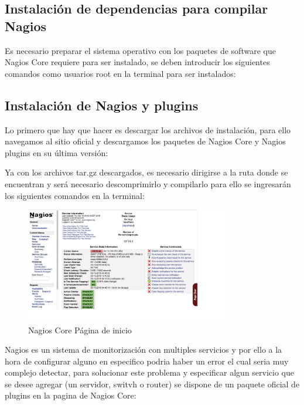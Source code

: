 \documentclass[12pt]{book}
\begin{document}
    \subsection{Instalación de dependencias para compilar Nagios }
    Es necesario preparar el sistema operativo con los paquetes de software que Nagios Core requiere para ser instalado, se deben introducir
    los siguientes comandos como usuarios root en la terminal para ser instalados:
    \begin{alltt}
      
    \end{alltt} 
    \subsection{Instalación de Nagios y plugins }
    Lo primero que hay que hacer es descargar los archivos de instalación, para ello navegamos al sitio oficial y descargamos los paquetes de
    Nagios Core y Nagios plugins en su última versión:
      \begin{alltt}
        
      \end{alltt} 
      Ya con los archivos tar.gz descargados, es necesario dirigirse a la ruta donde se encuentran y será necesario descomprimirlo y compilarlo
      para ello se ingresarán los siguientes comandos en la terminal:
    \begin{alltt}
      
    \end{alltt}
    \begin{figure}[htb]
      \centering
        \includegraphics[width=0.8\textwidth]{./Imagenes/nagios.png}
      \caption{Nagios Core Página de inicio} \label{fig:NagiosCorte}
    \end{figure}
      Nagios es un sistema de monitorización con multiples servicios y por ello a la hora de configurar alguno en especifico podria haber un error
      el cual seria muy complejo detectar, para solucionar este problema y especificar algun servicio que se desee agregar (un servidor, switvh o router)
      se dispone de un paquete oficial de plugins en la pagina de Nagios Core:
    \begin{alltt}
      
    \end{alltt} 
\end{document}
